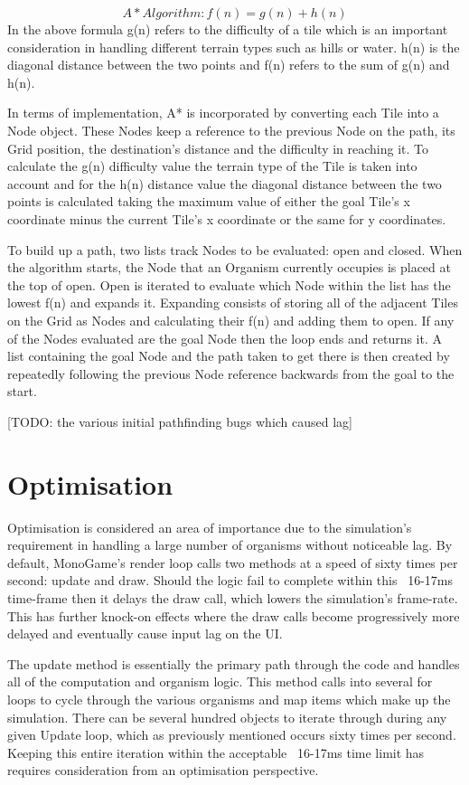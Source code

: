 \documentclass[a4paper, oneside, 11pt]{report}
\begin{document}
\[A* Algorithm: f(n) = g(n) + h(n)\]
In the above formula g(n) refers to the difficulty of a tile which is an important consideration in handling different terrain types such as hills or water. h(n) is the diagonal distance between the two points and f(n) refers to the sum of g(n) and h(n).

In terms of implementation, A* is incorporated by converting each Tile into a Node object. These Nodes keep a reference to the previous Node on the path, its Grid position, the destination's distance and the difficulty in reaching it. To calculate the g(n) difficulty value the terrain type of the Tile is taken into account and for the h(n) distance value the diagonal distance between the two points is calculated taking the maximum value of either the goal Tile's x coordinate minus the current Tile's x coordinate or the same for y coordinates. 

To build up a path, two lists track Nodes to be evaluated: open and closed. When the algorithm starts, the Node that an Organism currently occupies is placed at the top of open. Open is iterated to evaluate which Node within the list has the lowest f(n) and expands it. Expanding consists of storing all of the adjacent Tiles on the Grid as Nodes and calculating their f(n) and adding them to open. If any of the Nodes evaluated are the goal Node then the loop ends and returns it. A list containing the goal Node and the path taken to get there is then created by repeatedly following the previous Node reference backwards from the goal to the start.

[TODO: the various initial pathfinding bugs which caused lag]

\section{Optimisation}\label{optim}
Optimisation is considered an area of importance due to the simulation's requirement in handling a large number of organisms without noticeable lag. By default, MonoGame's render loop calls two methods at a speed of sixty times per second: update and draw. Should the logic fail to complete within this ~16-17ms time-frame then it delays the draw call, which lowers the simulation's frame-rate. This has further knock-on effects where the draw calls become progressively more delayed and eventually cause input lag on the UI.

The update method is essentially the primary path through the code and handles all of the computation and organism logic. This method calls into several for loops to cycle through the various organisms and map items which make up the simulation. There can be several hundred objects to iterate through during any given Update loop, which as previously mentioned occurs sixty times per second. Keeping this entire iteration within the acceptable ~16-17ms time limit has requires consideration from an optimisation perspective.
\end{document}
